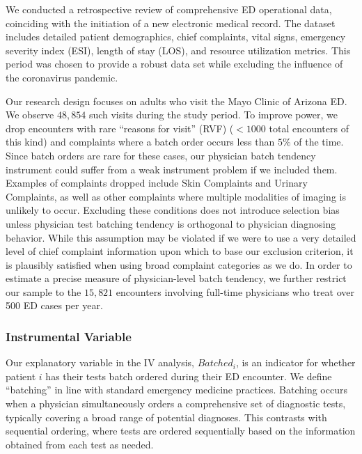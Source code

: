 \documentclass[,mnsc,nonblindrev]{informs}
\begin{document}
We conducted a retrospective review of comprehensive ED operational
data, coinciding with the initiation of a new electronic medical record.
The dataset includes detailed patient demographics, chief complaints,
vital signs, emergency severity index (ESI), length of stay (LOS), and
resource utilization metrics. This period was chosen to provide a robust
data set while excluding the influence of the coronavirus pandemic.

Our research design focuses on adults who visit the Mayo Clinic of
Arizona ED. We observe \(48,854\) such visits during the study period.
To improve power, we drop encounters with rare ``reasons for visit''
(RVF) (\(<1000\) total encounters of this kind) and complaints where a
batch order occurs less than \(5\%\) of the time. Since batch orders are
rare for these cases, our physician batch tendency instrument could
suffer from a weak instrument problem if we included them. Examples of
complaints dropped include Skin Complaints and Urinary Complaints, as
well as other complaints where multiple modalities of imaging is
unlikely to occur. Excluding these conditions does not introduce
selection bias unless physician test batching tendency is orthogonal to
physician diagnosing behavior. While this assumption may be violated if
we were to use a very detailed level of chief complaint information upon
which to base our exclusion criterion, it is plausibly satisfied when
using broad complaint categories as we do. In order to estimate a
precise measure of physician-level batch tendency, we further restrict
our sample to the \(15,821\) encounters involving full-time physicians
who treat over 500 ED cases per year.

\hypertarget{instrumental-variable}{%
\subsubsection{Instrumental Variable}\label{instrumental-variable}}

\hfill\break
Our explanatory variable in the IV analysis, \(Batched_i\), is an
indicator for whether patient \(i\) has their tests batch ordered during
their ED encounter. We define ``batching'' in line with standard
emergency medicine practices. Batching occurs when a physician
simultaneously orders a comprehensive set of diagnostic tests, typically
covering a broad range of potential diagnoses. This contrasts with
sequential ordering, where tests are ordered sequentially based on the
information obtained from each test as needed.
\end{document}

